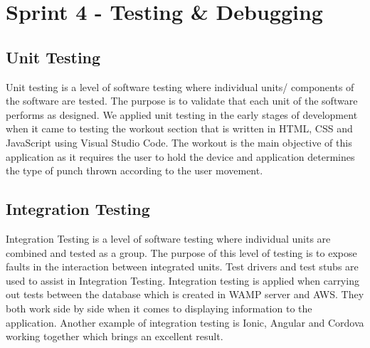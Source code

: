 \documentclass[a4paper,12pt]{report}
\begin{document}
\section{Sprint 4 - Testing \& Debugging}
\subsection{Unit Testing}
Unit testing is a level of software testing where individual units/ components of the software are tested. The purpose is to validate that each unit of the software performs as designed.\cite{unitTesting}
We applied unit testing in the early stages of development when it came to testing the workout section that is written in HTML, CSS and JavaScript using Visual Studio Code. The workout is the main objective of this application as it requires the user to hold the device and application determines the type of punch thrown according to the user movement.
\subsection{Integration Testing}
Integration Testing is a level of software testing where individual units are combined and tested as a group. The purpose of this level of testing is to expose faults in the interaction between integrated units. Test drivers and test stubs are used to assist in Integration Testing.\cite{integrationTesting}
Integration testing is applied when carrying out tests between the database which is created in WAMP server and AWS. They both work side by side when it comes to displaying information to the application. Another example of integration testing is Ionic, Angular and Cordova working together which brings an excellent result.
\newpage
\end{document}
